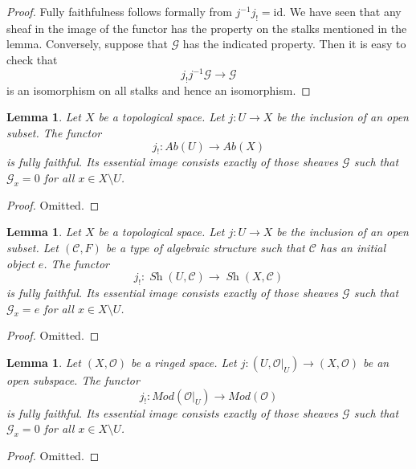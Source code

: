 \documentclass{stacks-project}
\theoremstyle{plain}
\newtheorem{lemma}[subsection]{Lemma}
\theoremstyle{definition}
\theoremstyle{remark}
\numberwithin{equation}{subsection}
\def\Sh{\mathop{\mathit{Sh}}\nolimits}
\begin{document}
\begin{proof}
Fully faithfulness follows formally from $j^{-1} j_! = \text{id}$.
We have seen that any sheaf in the image of the functor has
the property on the stalks mentioned in the lemma. Conversely, suppose
that $\mathcal{G}$ has the indicated property.
Then it is easy to check that
$$
j_! j^{-1} \mathcal{G} \to \mathcal{G}
$$
is an isomorphism on all stalks and hence an isomorphism.
\end{proof}

\begin{lemma}
\label{lemma-equivalence-categories-open-abelian}
Let $X$ be a topological space.
Let $j : U \to X$ be the inclusion of an open subset.
The functor
$$
j_! : \textit{Ab}(U) \longrightarrow \textit{Ab}(X)
$$
is fully faithful. Its essential image consists exactly
of those sheaves $\mathcal{G}$ such that
$\mathcal{G}_x = 0$ for all $x \in X \setminus U$.
\end{lemma}

\begin{proof}
Omitted.
\end{proof}

\begin{lemma}
\label{lemma-equivalence-categories-open-structures}
Let $X$ be a topological space.
Let $j : U \to X$ be the inclusion of an open subset.
Let $(\mathcal{C}, F)$ be a type of algebraic structure
such that $\mathcal{C}$ has an initial object $e$.
The functor
$$
j_! : \Sh(U, \mathcal{C}) \longrightarrow \Sh(X, \mathcal{C})
$$
is fully faithful. Its essential image consists exactly
of those sheaves $\mathcal{G}$ such that
$\mathcal{G}_x = e$ for all $x \in X \setminus U$.
\end{lemma}

\begin{proof}
Omitted.
\end{proof}


\begin{lemma}
\label{lemma-equivalence-categories-open-modules}
Let $(X, \mathcal{O})$ be a ringed space.
Let $j : (U, \mathcal{O}|_U) \to (X, \mathcal{O})$
be an open subspace.
The functor
$$
j_! : \textit{Mod}(\mathcal{O}|_U) \longrightarrow \textit{Mod}(\mathcal{O})
$$
is fully faithful. Its essential image consists exactly
of those sheaves $\mathcal{G}$ such that
$\mathcal{G}_x = 0$ for all $x \in X \setminus U$.
\end{lemma}

\begin{proof}
Omitted.
\end{proof}
\end{document}
